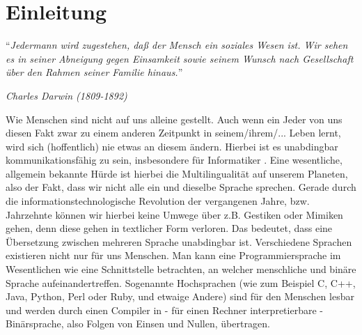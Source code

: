 \documentclass{standalone}
\begin{document}


\chapter{Einleitung}
\epigraph{\enquote{\textit{Jedermann wird zugestehen, daß der Mensch ein soziales Wesen ist. Wir sehen es in seiner Abneigung gegen Einsamkeit sowie seinem Wunsch nach Gesellschaft über den Rahmen seiner Familie hinaus.}}}{\textit{Charles Darwin (1809-1892)}}

Wie Menschen sind nicht auf uns alleine gestellt. Auch wenn ein Jeder von uns diesen Fakt zwar zu einem anderen Zeitpunkt in seinem/ihrem/... Leben lernt, wird sich (hoffentlich) nie etwas an diesem ändern. Hierbei ist es unabdingbar kommunikationsfähig zu sein, insbesondere für Informatiker \cite{Soziale_Kompetenzen_fuer_Informatiker_Schumacher_2013}. 
Eine wesentliche, allgemein bekannte Hürde ist hierbei die Multilingualität auf unserem Planeten, also der Fakt, dass wir nicht alle ein und dieselbe Sprache sprechen. Gerade durch die informationstechnologische Revolution der vergangenen Jahre, bzw. Jahrzehnte können wir hierbei keine Umwege über z.B. Gestiken oder Mimiken gehen, denn diese gehen in textlicher Form verloren. 
Das bedeutet, dass eine Übersetzung zwischen mehreren Sprache unabdingbar ist. Verschiedene Sprachen existieren nicht nur für uns Menschen. Man kann eine Programmiersprache im Wesentlichen wie eine Schnittstelle betrachten, an welcher menschliche und binäre Sprache aufeinandertreffen. 
Sogenannte Hochsprachen (wie zum Beispiel C, C++, Java, Python, Perl oder Ruby, und etwaige Andere) sind für den Menschen lesbar und werden durch einen Compiler in - für einen Rechner interpretierbare - Binärsprache, also Folgen von Einsen und Nullen, übertragen. 
\end{document}
